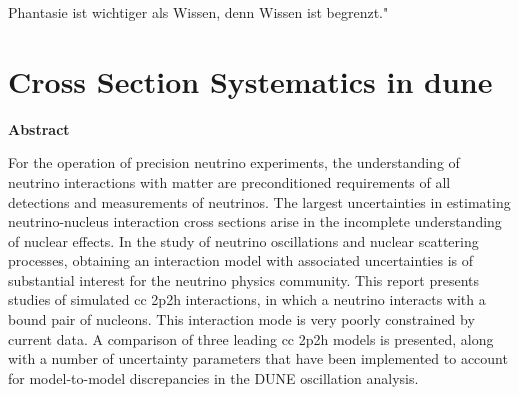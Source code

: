 \begin{savequote}[8cm]
Phantasie ist wichtiger als Wissen, denn Wissen ist begrenzt."

\end{savequote}

\chapter{Cross Section Systematics in \texorpdfstring{\acrshort{dune}}{TEXT}}

\begin{center}
\textbf{Abstract\\}
\end{center} \vspace{-4mm}
For the operation of precision neutrino experiments, the understanding of neutrino interactions with matter %
are preconditioned requirements of all detections and measurements of neutrinos. The largest uncertainties in estimating neutrino-nucleus interaction cross sections arise in the incomplete understanding of nuclear effects. %
In the study of neutrino oscillations and nuclear scattering processes, obtaining an interaction model with associated uncertainties is of substantial interest for the neutrino physics community. %
This report presents studies of simulated \acrshort{cc} \acrshort{2p2h} interactions, in which a neutrino interacts with a bound pair of nucleons. This interaction mode is very poorly constrained by current data. A comparison of three leading \acrshort{cc} \acrshort{2p2h} models is presented, along with a number of uncertainty parameters that have been implemented to account for model-to-model discrepancies in the DUNE oscillation analysis.

\vspace{-2mm}
